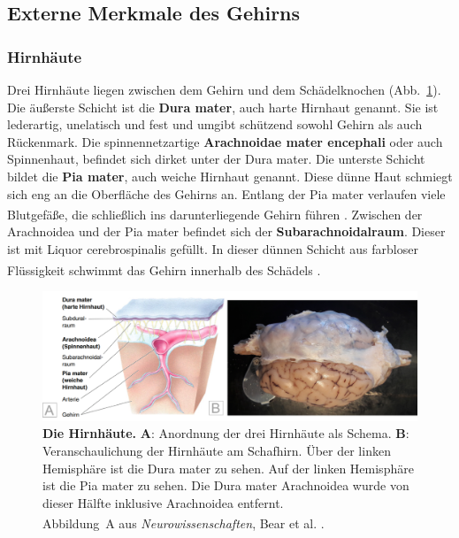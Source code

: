 \documentclass[12pt,a4paper,pdftex]{article}
\begin{document}
\subsection{Externe Merkmale des Gehirns}
\label{subsec:Externe_Merkmale}

\subsubsection{Hirnhäute} 

Drei Hirnhäute liegen zwischen dem Gehirn und dem Schädelknochen (Abb.~\ref{fig:hirnhaeute}). Die äußerste Schicht ist die \textbf{Dura mater}, auch harte Hirnhaut genannt. Sie ist lederartig, unelatisch und fest und umgibt schützend sowohl Gehirn als auch Rückenmark. Die spinnennetzartige \textbf{Arachnoidae mater encephali} oder auch Spinnenhaut, befindet sich dirket unter der Dura mater. Die unterste Schicht bildet die \textbf{Pia mater}, auch weiche Hirnhaut genannt. Diese dünne Haut schmiegt sich eng an die Oberfläche des Gehirns an. Entlang der Pia mater verlaufen viele Blutgefäße, die schließlich ins darunterliegende Gehirn führen \textsuperscript{\cite[7]{neurowissenschaften_baer}}. Zwischen der Arachnoidea und der Pia mater befindet sich der \textbf{Subarachnoidalraum}. Dieser ist mit Liquor cerebrospinalis gefüllt. In dieser dünnen Schicht aus farbloser Flüssigkeit schwimmt das Gehirn innerhalb des Schädels \textsuperscript{\cite[7]{neurowissenschaften_baer}}.

\begin{figure}[H]
	\centering
	\includegraphics[width=\textwidth]{pictures/Bilder_Jule/Andere/hirnhaeute2.png}
	\caption[Die Hirnhäute]{\textbf{Die Hirnhäute.} \textbf{A}: Anordnung der drei Hirnhäute als Schema. \textbf{B}: Veranschaulichung der Hirnhäute am Schafhirn. Über der linken Hemisphäre ist die Dura mater zu sehen. Auf der linken Hemisphäre ist die Pia mater zu sehen. Die Dura mater Arachnoidea wurde von dieser Hälfte inklusive Arachnoidea entfernt.\\
	Abbildung~A aus \textit{Neurowissenschaften}, Bear et al. \textsuperscript{\cite[7]{neurowissenschaften_baer}}.}
	\label{fig:hirnhaeute}
\end{figure}
\end{document}
